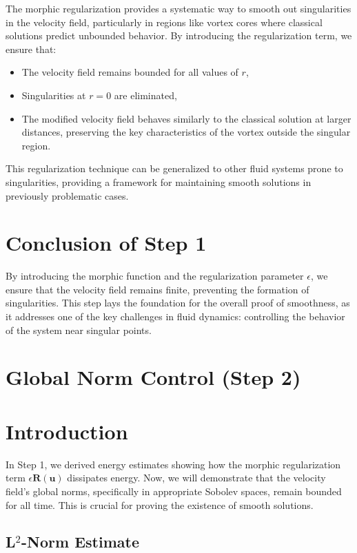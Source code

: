 \documentclass{article}
\begin{document}
The morphic regularization provides a systematic way to smooth out singularities in the velocity field, particularly in regions like vortex cores where classical solutions predict unbounded behavior. By introducing the regularization term, we ensure that:
\begin{itemize}
    \item The velocity field remains bounded for all values of \( r \),
    \item Singularities at \( r = 0 \) are eliminated,
    \item The modified velocity field behaves similarly to the classical solution at larger distances, preserving the key characteristics of the vortex outside the singular region.
\end{itemize}

This regularization technique can be generalized to other fluid systems prone to singularities, providing a framework for maintaining smooth solutions in previously problematic cases.

\section*{Conclusion of Step 1}

By introducing the morphic function and the regularization parameter \( \epsilon \), we ensure that the velocity field remains finite, preventing the formation of singularities. This step lays the foundation for the overall proof of smoothness, as it addresses one of the key challenges in fluid dynamics: controlling the behavior of the system near singular points.

\section*{Global Norm Control (Step 2)}

\section*{Introduction}

In Step 1, we derived energy estimates showing how the morphic regularization term \( \epsilon \mathbf{R}(\mathbf{u}) \) dissipates energy. Now, we will demonstrate that the velocity field's global norms, specifically in appropriate Sobolev spaces, remain bounded for all time. This is crucial for proving the existence of smooth solutions.

\subsection*{L\(^2\)-Norm Estimate}
\end{document}
